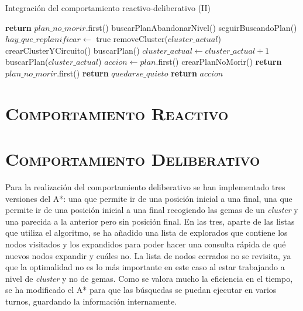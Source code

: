 \documentclass[11pt,a4paper]{article}
\begin{document}
\begin{algorithm}[H]
\caption{Integración del comportamiento reactivo-deliberativo (II)}
\begin{algorithmic}[1]
\EndIf
\State {}
	\State \textbf{return} $plan\_no\_morir$.first()
\EndIf
{} 
	\State buscarPlanAbandonarNivel()
\EndIf
{} 
	\State seguirBuscandoPlan()
\EndIf
{}
	\State $hay\_que\_replanificar \gets $ true
		\State removeCluster($cluster\_actual$) 
		\State crearClusterYCircuito() 
	\EndIf
\EndIf
{}
	\State buscarPlan()
\EndIf
{}
		\State $cluster\_actual \gets cluster\_actual + 1$
		\State buscarPlan($cluster\_actual$)
	\Else
		\State $accion \gets plan$.first()
	\EndIf
\EndIf
\State {}
	\State crearPlanNoMorir()
	\State \textbf{return} $plan\_no\_morir$.first()
\EndIf
{}
	\State \textbf{return} $quedarse\_quieto$
\EndIf
\State \textbf{return} $accion$
\EndProcedure
\end{algorithmic}
\end{algorithm}

\section{\textsc{Comportamiento Reactivo}}

\newpage

\section{\textsc{Comportamiento Deliberativo}}

Para la realización del comportamiento deliberativo se han implementado tres versiones del A*: una
que permite ir de una posición inicial a una final, una que permite ir de una posición inicial a
una final recogiendo las gemas de un \textit{cluster} y una parecida a la anterior pero sin posición
final. En las tres, aparte de las listas que utiliza el algoritmo, se ha añadido una lista de explorados
que contiene los nodos visitados y los expandidos para poder hacer una consulta rápida de qué nuevos
nodos expandir y cuáles no. La lista de nodos cerrados no se revisita, ya que la optimalidad no es lo más
importante en este caso al estar trabajando a nivel de \textit{cluster} y no de gemas. Como se valora
mucho la eficiencia en el tiempo, se ha modificado el A* para que las búsquedas se puedan ejecutar en
varios turnos, guardando la información internamente.
\end{document}
